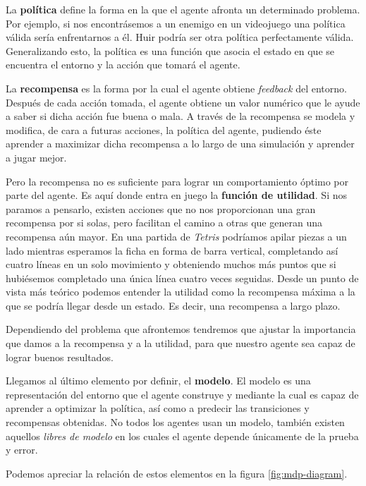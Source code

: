 La \textbf{política} define la forma en la que el agente afronta un determinado problema. Por ejemplo, si nos encontrásemos a un enemigo en un videojuego una política válida sería enfrentarnos a él. Huir podría ser otra política perfectamente válida. Generalizando esto, la política es una función que asocia el estado en que se encuentra el entorno y la acción que tomará el agente.

La \textbf{recompensa} es la forma por la cual el agente obtiene \textit{feedback} del entorno. Después de cada acción tomada, el agente obtiene un valor numérico que le ayude a saber si dicha acción fue buena o mala. A través de la recompensa se modela y modifica, de cara a futuras acciones, la política del agente, pudiendo éste aprender a maximizar dicha recompensa a lo largo de una simulación y aprender a jugar mejor.

Pero la recompensa no es suficiente para lograr un comportamiento óptimo por parte del agente. Es aquí donde entra en juego la \textbf{función de utilidad}. Si nos paramos a pensarlo, existen acciones que no nos proporcionan una gran recompensa por si solas, pero facilitan el camino a otras que generan una recompensa aún mayor. En una partida de \textit{Tetris} podríamos apilar piezas a un lado mientras esperamos la ficha en forma de barra vertical, completando así cuatro líneas en un solo movimiento y obteniendo muchos más puntos que si hubiésemos completado una única línea cuatro veces seguidas. Desde un punto de vista más teórico podemos entender la utilidad como la recompensa máxima a la que se podría llegar desde un estado. Es decir, una recompensa a largo plazo.

Dependiendo del problema que afrontemos tendremos que ajustar la importancia que damos a la recompensa y a la utilidad, para que nuestro agente sea capaz de lograr buenos resultados.

Llegamos al último elemento por definir, el \textbf{modelo}. El modelo es una representación del entorno que el agente construye y mediante la cual es capaz de aprender a optimizar la política, así como a predecir las transiciones y recompensas obtenidas. No todos los agentes usan un modelo, también existen aquellos \textit{libres de modelo} en los cuales el agente depende únicamente de la prueba y error. 


Podemos apreciar la relación de estos elementos en la figura \ref{fig:mdp-diagram}.


